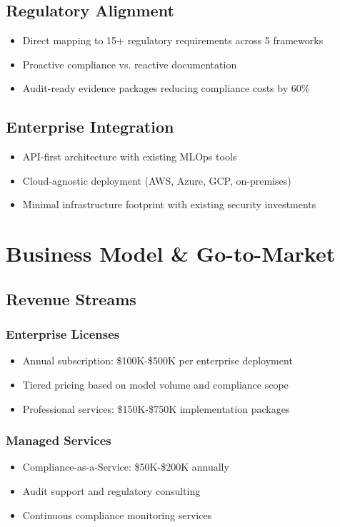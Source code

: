 \documentclass[12pt,a4paper]{article}
\begin{document}
\subsection{Regulatory Alignment}
\begin{itemize}
    \item Direct mapping to 15+ regulatory requirements across 5 frameworks
    \item Proactive compliance vs. reactive documentation
    \item Audit-ready evidence packages reducing compliance costs by 60\%
\end{itemize}

\subsection{Enterprise Integration}
\begin{itemize}
    \item API-first architecture with existing MLOps tools
    \item Cloud-agnostic deployment (AWS, Azure, GCP, on-premises)
    \item Minimal infrastructure footprint with existing security investments
\end{itemize}

\section{Business Model \& Go-to-Market}

\subsection{Revenue Streams}

\subsubsection{Enterprise Licenses}
\begin{itemize}
    \item Annual subscription: \$100K-\$500K per enterprise deployment
    \item Tiered pricing based on model volume and compliance scope
    \item Professional services: \$150K-\$750K implementation packages
\end{itemize}

\subsubsection{Managed Services}
\begin{itemize}
    \item Compliance-as-a-Service: \$50K-\$200K annually
    \item Audit support and regulatory consulting
    \item Continuous compliance monitoring services
\end{itemize}
\end{document}
